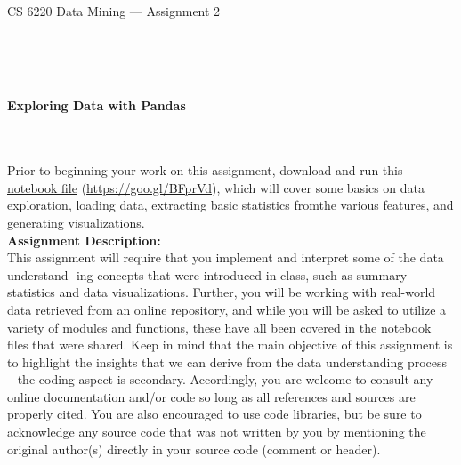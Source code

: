 \documentclass[letter-paper,12pt]{article} %
\begin{document}

\begin{center}
\begin{Huge}
CS 6220 Data Mining --- Assignment 2
\end{Huge}
\end{center}

\hline
\hline
~\\~\\~\\

\begin{center}
\begin{Large}
\textbf{Exploring Data with Pandas}
\end{Large}
\end{center}
~\\~\\

Prior to beginning your work on this assignment, download and run this \href{https://goo.gl/BFprVd}{notebook file} (\url{https://goo.gl/BFprVd}), which will cover some basics on data exploration, loading data, extracting basic statistics fromthe various features, and generating visualizations.\\

\textbf{Assignment Description:}\\
This assignment will require that you implement and interpret some of the data understand- ing concepts that were introduced in class, such as summary statistics and data visualizations. Further, you will be working with real-world data retrieved from an online repository, and while you will be asked to utilize a variety of modules and functions, these have all been covered in the notebook files that were shared. Keep in mind that the main objective of this assignment is to highlight the insights that we can derive from the data understanding process – the coding aspect is secondary. Accordingly, you are welcome to consult any online documentation and/or code so long as all references and sources are properly cited. You are also encouraged to use code libraries, but be sure to acknowledge any source code that was not written by you by mentioning the original author(s) directly in your source code (comment or header).\\
\end{document}
